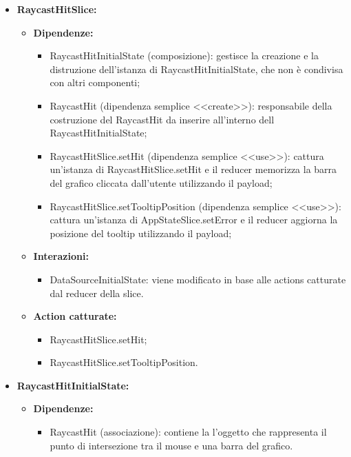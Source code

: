 \begin{itemize}
    \item \textbf{RaycastHitSlice:}
    \begin{itemize}
        \item \textbf{Dipendenze:}
        \begin{itemize}
            \item RaycastHitInitialState (composizione): gestisce la creazione e la distruzione dell'istanza di RaycastHitInitialState, che non è condivisa con altri componenti;
            \item RaycastHit (dipendenza semplice <<create>>): responsabile della costruzione del RaycastHit da inserire all’interno dell RaycastHitInitialState;
            \item RaycastHitSlice.setHit (dipendenza semplice <<use>>): cattura un’istanza di RaycastHitSlice.setHit e il reducer memorizza la barra del grafico cliccata dall'utente utilizzando il payload;
            \item RaycastHitSlice.setTooltipPosition (dipendenza semplice <<use>>): cattura un’istanza di AppStateSlice.setError e il reducer aggiorna la posizione del tooltip utilizzando il payload;
        \end{itemize} 
        \item \textbf{Interazioni:}
        \begin{itemize}
            \item DataSourceInitialState: viene modificato in base alle actions catturate dal reducer della slice.
        \end{itemize} 
        \item \textbf{Action catturate:}
        \begin{itemize}
            \item RaycastHitSlice.setHit;
            \item RaycastHitSlice.setTooltipPosition.
        \end{itemize} 
    \end{itemize}

    
    \item \textbf{RaycastHitInitialState:}
    \begin{itemize}
        \item \textbf{Dipendenze:}
        \begin{itemize}
            \item RaycastHit (associazione): contiene la l'oggetto che rappresenta il punto di intersezione tra il mouse e una barra del grafico.
        \end{itemize} 
    \end{itemize}


\end{itemize}
